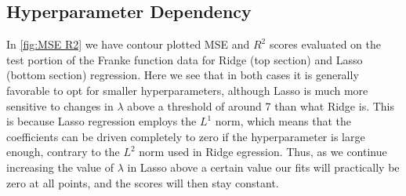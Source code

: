 \documentclass[aps,pra,english,notitlepage,reprint,nofootinbib]{revtex4-1}  %
\begin{document}
\subsection{Hyperparameter Dependency}\label{subsec:hyperparameter}
In \cref{fig:MSE R2} we have contour plotted MSE and $R^2$ scores evaluated on the test portion of the Franke function data for Ridge (top section) and Lasso (bottom section) regression. Here we see that in both cases it is generally favorable to opt for smaller hyperparameters, although Lasso is much more sensitive to changes in $\lambda$ above a threshold of around 7 than what Ridge is. This is because Lasso regression employs the $L^1$ norm, which means that the coefficients can be driven completely to zero if the hyperparameter is large enough, contrary to the $L^2$ norm used in Ridge egression. Thus, as we continue increasing the value of $\lambda$ in Lasso above a certain value our fits will practically be zero at all points, and the scores will then stay constant.
\end{document}
